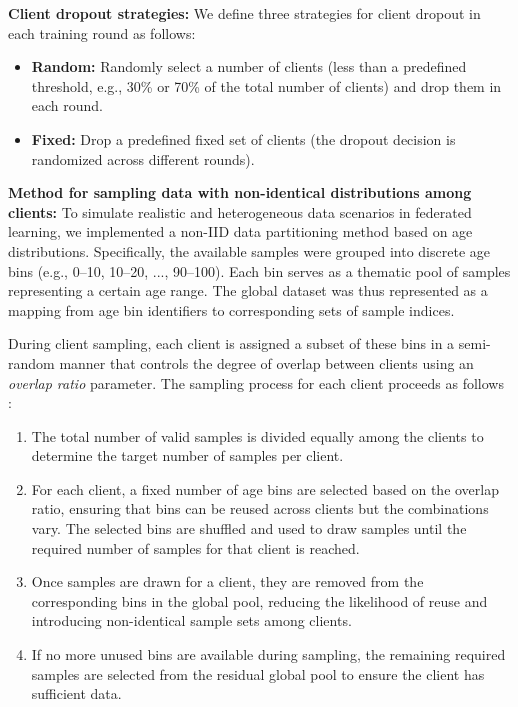\documentclass[12pt, a4paper]{article}
\begin{document}
\textbf{Client dropout strategies:} We define three strategies for client dropout in each training round as follows:

\begin{itemize}
    \item \textbf{Random:} Randomly select a number of clients (less than a predefined threshold, e.g., 30\% or 70\% of the total number of clients) and drop them in each round.

    \item \textbf{Fixed:} Drop a predefined fixed set of clients (the dropout decision is randomized across different rounds).
\end{itemize}

\textbf{Method for sampling data with non-identical distributions among clients:}
To simulate realistic and heterogeneous data scenarios in federated learning, we implemented a non-IID data partitioning method based on age distributions. Specifically, the available samples were grouped into discrete age bins (e.g., 0–10, 10–20, ..., 90–100). Each bin serves as a thematic pool of samples representing a certain age range. The global dataset was thus represented as a mapping from age bin identifiers to corresponding sets of sample indices.

During client sampling, each client is assigned a subset of these bins in a semi-random manner that controls the degree of overlap between clients using an \textit{overlap ratio} parameter. The sampling process for each client proceeds as follows :

\begin{enumerate}
    \item The total number of valid samples is divided equally among the clients to determine the target number of samples per client.
    \item For each client, a fixed number of age bins are selected based on the overlap ratio, ensuring that bins can be reused across clients but the combinations vary. The selected bins are shuffled and used to draw samples until the required number of samples for that client is reached.
    \item Once samples are drawn for a client, they are removed from the corresponding bins in the global pool, reducing the likelihood of reuse and introducing non-identical sample sets among clients.
    \item If no more unused bins are available during sampling, the remaining required samples are selected from the residual global pool to ensure the client has sufficient data.
\end{enumerate}
\end{document}
